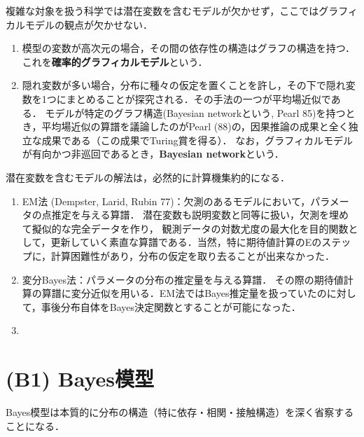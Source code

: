 \documentclass[uplatex,dvipdfmx]{jsreport}
\begin{document}
\begin{remarks}[計算機科学的な観点から見る統計モデル]
    複雑な対象を扱う科学では潜在変数を含むモデルが欠かせず，ここではグラフィカルモデルの観点が欠かせない．
    \begin{enumerate}
        \item 模型の変数が高次元の場合，その間の依存性の構造はグラフの構造を持つ．これを\textbf{確率的グラフィカルモデル}という．
        \item 隠れ変数が多い場合，分布に種々の仮定を置くことを許し，その下で隠れ変数を1つにまとめることが探究される．その手法の一つが平均場近似である．
        モデルが特定のグラフ構造(Bayesian networkという, Pearl 85)を持つとき，平均場近似の算譜を議論したのがPearl (88)の，因果推論の成果と全く独立な成果である（この成果でTuring賞を得る）．
        なお，グラフィカルモデルが有向かつ非巡回であるとき，\textbf{Bayesian network}という．
    \end{enumerate}
\end{remarks}

\begin{remarks}
    潜在変数を含むモデルの解法は，必然的に計算機集約的になる．
    \begin{enumerate}
        \item EM法 (Dempster, Larid, Rubin 77)：欠測のあるモデルにおいて，パラメータの点推定を与える算譜．
        潜在変数も説明変数と同等に扱い，欠測を埋めて擬似的な完全データを作り，
        観測データの対数尤度の最大化を目的関数として，更新していく素直な算譜である．当然，特に期待値計算のEのステップに，計算困難性があり，分布の仮定を取り去ることが出来なかった．
        \item 変分Bayes法：パラメータの分布の推定量を与える算譜．
        その際の期待値計算の算譜に変分近似を用いる．EM法ではBayes推定量を扱っていたのに対して，事後分布自体をBayes決定関数とすることが可能になった．
        \item 
    \end{enumerate}
\end{remarks}

\section{(B1) Bayes模型}

\begin{tcolorbox}[colframe=ForestGreen, colback=ForestGreen!10!white,breakable,colbacktitle=ForestGreen!40!white,coltitle=black,fonttitle=\bfseries\sffamily,
title=]
    Bayes模型は本質的に分布の構造（特に依存・相関・接触構造）を深く省察することになる．
\end{tcolorbox}
\end{document}
